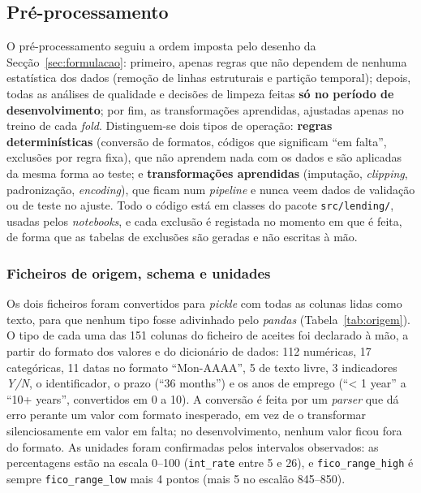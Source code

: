 
\subsection{Pré-processamento}
\label{sec:preprocessamento}

O pré-processamento seguiu a ordem imposta pelo desenho da Secção~\ref{sec:formulacao}:
primeiro, apenas regras que não dependem de nenhuma estatística dos dados (remoção de
linhas estruturais e partição temporal); depois, todas as análises de qualidade e decisões
de limpeza feitas \textbf{só no período de desenvolvimento}; por fim, as transformações
aprendidas, ajustadas apenas no treino de cada \textit{fold}. Distinguem-se dois tipos de
operação: \textbf{regras determinísticas} (conversão de formatos, códigos que significam
``em falta'', exclusões por regra fixa), que não aprendem nada com os dados e são aplicadas
da mesma forma ao teste; e \textbf{transformações aprendidas} (imputação, \textit{clipping},
padronização, \textit{encoding}), que ficam num \textit{pipeline} e nunca veem dados de
validação ou de teste no ajuste. Todo o código está em classes do pacote
\texttt{src/lending/}, usadas pelos \textit{notebooks}, e cada exclusão é registada no
momento em que é feita, de forma que as tabelas de exclusões são geradas e não escritas à
mão.

\subsubsection{Ficheiros de origem, schema e unidades}

Os dois ficheiros foram convertidos para \textit{pickle} com todas as colunas lidas como
texto, para que nenhum tipo fosse adivinhado pelo \textit{pandas}
(Tabela~\ref{tab:origem}). O tipo de cada uma das 151 colunas do ficheiro de aceites foi
declarado à mão, a partir do formato dos valores e do dicionário de dados: 112 numéricas,
17 categóricas, 11 datas no formato ``Mon-AAAA'', 5 de texto livre, 3 indicadores
\textit{Y/N}, o identificador, o prazo (``36 months'') e os anos de emprego (``< 1 year''
a ``10+ years'', convertidos em 0 a 10). A conversão é feita por um \textit{parser} que
dá erro perante um valor com formato inesperado, em vez de o transformar silenciosamente
em valor em falta; no desenvolvimento, nenhum valor ficou fora do formato. As unidades
foram confirmadas pelos intervalos observados: as percentagens estão na escala 0--100
(\texttt{int\_rate} entre 5 e 26), e \texttt{fico\_range\_high} é sempre
\texttt{fico\_range\_low} mais 4 pontos (mais 5 no escalão 845--850).


